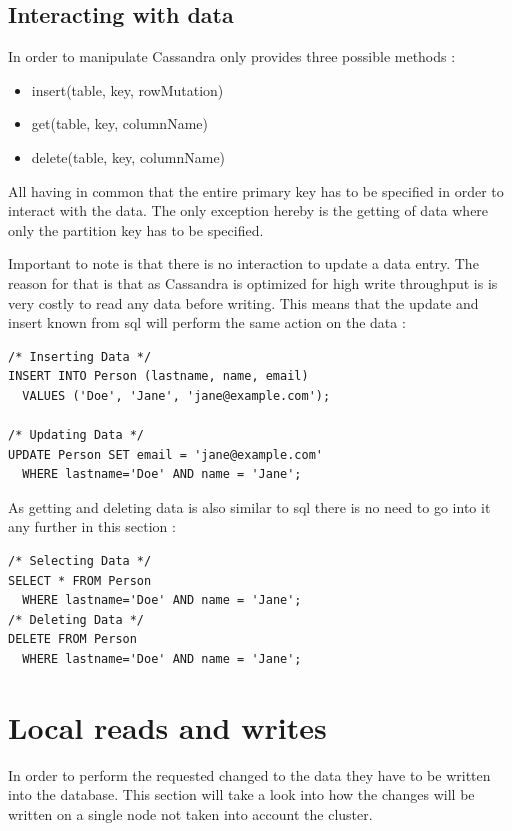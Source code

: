 \subsection{Interacting with data}
In order to manipulate Cassandra only provides three possible methods \autocite{lakshman2010cassandra}:
\begin{itemize}
    \item insert(table, key, rowMutation)
    \item get(table, key, columnName)
    \item delete(table, key, columnName)
\end{itemize}
All having in common that the entire primary key has to be specified in order to interact with the data. The only exception hereby is the getting of data where only the partition key has to be specified.

Important to note is that there is no interaction to update a data entry. The reason for that is that as Cassandra is optimized for high write throughput is is very costly to read any data before writing. This means that the update and insert known from \gls{sql} will perform the same action on the data \autocite{cqlAlexMeng, newInCQL3}:
\begin{verbatim}
/* Inserting Data */
INSERT INTO Person (lastname, name, email)
  VALUES ('Doe', 'Jane', 'jane@example.com');

/* Updating Data */
UPDATE Person SET email = 'jane@example.com'
  WHERE lastname='Doe' AND name = 'Jane';
\end{verbatim}

As getting and deleting data is also similar to \gls{sql} there is no need to go into it any further in this section \autocite{cqlAlexMeng, cassandra3cqldocSelect}:
\begin{verbatim}
/* Selecting Data */
SELECT * FROM Person
  WHERE lastname='Doe' AND name = 'Jane';
/* Deleting Data */
DELETE FROM Person
  WHERE lastname='Doe' AND name = 'Jane';
\end{verbatim}

\section{Local reads and writes}
In order to perform the requested changed to the data they have to be written into the database. This section will take a look into how the changes will be written on a single node not taken into account the cluster.

